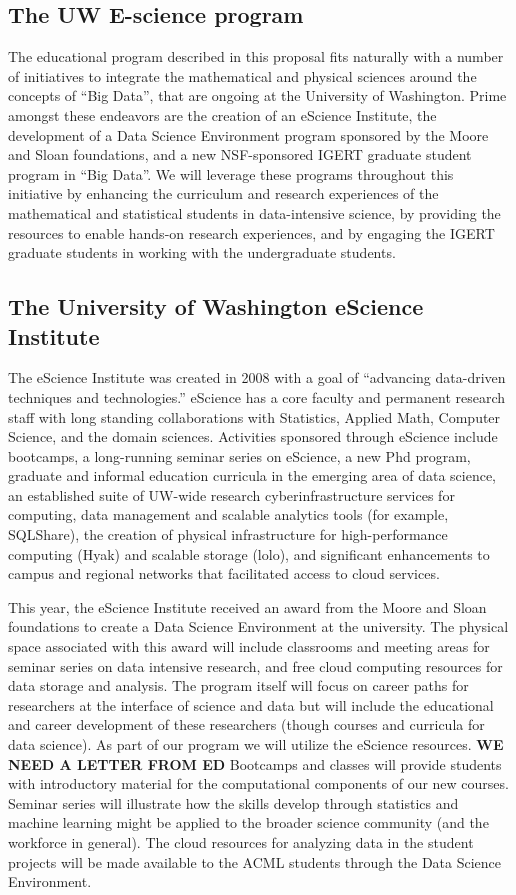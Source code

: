\subsection{The UW E-science program}
The educational program described in this proposal fits naturally with a number of initiatives to integrate the mathematical and physical sciences around the concepts of ``Big Data'', that are ongoing at the University of Washington. Prime amongst these endeavors are the creation of an eScience Institute, the development of a Data Science Environment program sponsored by the Moore and Sloan foundations, and a new NSF-sponsored IGERT graduate student program in ``Big Data''. We will leverage these programs throughout this initiative by enhancing the curriculum and research experiences of the mathematical and statistical students in data-intensive science, by providing the resources to enable hands-on research experiences, and by engaging the IGERT graduate students in working with the undergraduate students.

\subsection{The University of Washington eScience Institute}

The eScience Institute was created in 2008 with a goal of “advancing data-driven techniques and technologies.” eScience has a core faculty and permanent research staff with long standing collaborations with Statistics, Applied Math, Computer Science, and the domain sciences. Activities sponsored through eScience include bootcamps, a long-running seminar series on eScience, a new Phd program, graduate and informal education curricula in the emerging area of data science, an established suite of UW-wide research cyberinfrastructure services for computing, data management and scalable analytics tools (for example, SQLShare), the creation of physical infrastructure for high-performance computing (Hyak) and scalable storage (lolo), and significant enhancements to campus and regional networks that facilitated access to cloud services.

This year, the eScience Institute received an award from the Moore and Sloan foundations to create a Data Science Environment at the university. The physical space associated with this award will include classrooms and meeting areas for seminar series on data intensive research, and free cloud computing resources for data storage and analysis. The program itself will focus on career paths for researchers at the interface of science and data but will include the educational and career development of these researchers (though courses and curricula for data science). As part of our program we will utilize the eScience resources. {\bf WE NEED A LETTER FROM ED} Bootcamps and classes will provide students with introductory material for the computational components of our new courses. Seminar series will illustrate how the skills develop through statistics and machine learning might be applied to the broader science community (and the workforce in general). The cloud resources for analyzing data in the student projects will be made available to the ACML students through the Data Science Environment.

